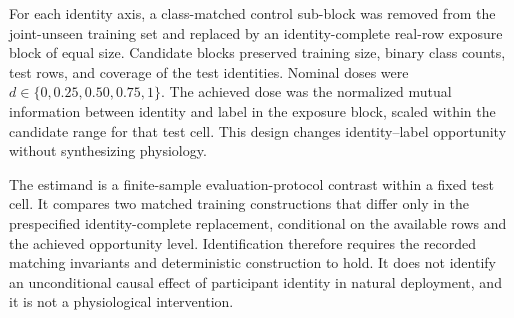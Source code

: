 \documentclass[preprint,12pt]{elsarticle}
\begin{document}
For each identity axis, a class-matched control sub-block was removed from the joint-unseen training set and replaced by an identity-complete real-row exposure block of equal size. Candidate blocks preserved training size, binary class counts, test rows, and coverage of the test identities. Nominal doses were $d\in\{0,0.25,0.50,0.75,1\}$. The achieved dose was the normalized mutual information between identity and label in the exposure block, scaled within the candidate range for that test cell. This design changes identity--label opportunity without synthesizing physiology.

The estimand is a finite-sample evaluation-protocol contrast within a fixed test cell. It compares two matched training constructions that differ only in the prespecified identity-complete replacement, conditional on the available rows and the achieved opportunity level. Identification therefore requires the recorded matching invariants and deterministic construction to hold. It does not identify an unconditional causal effect of participant identity in natural deployment, and it is not a physiological intervention.
\end{document}
